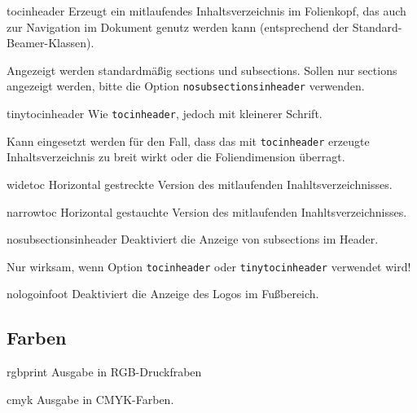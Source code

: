 \documentclass[cmyk,a4paper,colorscheme=green,TUBStitlepage=picture]{tubsreprt}
\begin{document}
\begin{classoption}{tocinheader}
  Erzeugt ein mitlaufendes Inhaltsverzeichnis im Folienkopf,
  das auch zur Navigation im Dokument genutz werden kann
  (entsprechend der Standard-Beamer-Klassen).
  
  Angezeigt werden standardmäßig sections und subsections.
  Sollen nur sections angezeigt werden, bitte die Option
  \lstinline{nosubsectionsinheader} verwenden.
  
\end{classoption}

\begin{classoption}{tinytocinheader}
  Wie \lstinline{tocinheader}, jedoch mit kleinerer Schrift.

  Kann eingesetzt werden für den Fall, dass das mit \lstinline{tocinheader}
  erzeugte Inhaltsverzeichnis zu breit wirkt oder die Foliendimension
  überragt.
\end{classoption}

\begin{classoption}{widetoc}
  Horizontal gestreckte Version des mitlaufenden Inahltsverzeichnisses.
\end{classoption}

\begin{classoption}{narrowtoc}
  Horizontal gestauchte Version des mitlaufenden Inahltsverzeichnisses.
\end{classoption}

\begin{classoption}{nosubsectionsinheader}
  Deaktiviert die Anzeige von subsections im Header.
  
  Nur wirksam, wenn Option \lstinline{tocinheader} oder
  \lstinline{tinytocinheader} verwendet wird!
\end{classoption}

\begin{classoption}{nologoinfoot}
  Deaktiviert die Anzeige des Logos im Fußbereich.
\end{classoption}

\subsection{Farben}

\begin{classoption}{rgbprint}
  Ausgabe in RGB-Druckfraben
\end{classoption}

\begin{classoption}{cmyk}
  Ausgabe in CMYK-Farben.
\end{classoption}
\end{document}
